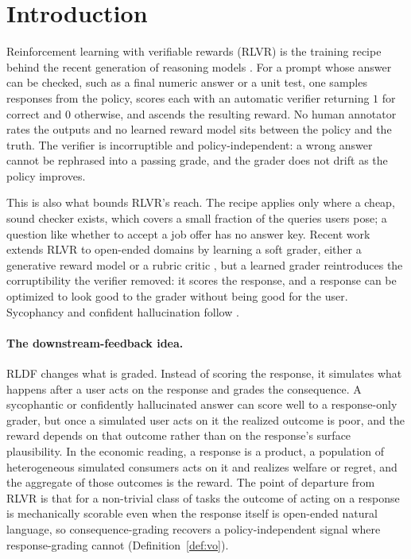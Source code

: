 \documentclass[11pt]{article}
\theoremstyle{plain}
\theoremstyle{definition}
\theoremstyle{remark}
\begin{document}
\section{Introduction}
\label{sec:intro}

Reinforcement learning with verifiable rewards (RLVR) is the training recipe behind the recent
generation of reasoning models \cite{deepseekr1,tulu3,deepseekmath}. For a prompt whose answer
can be checked, such as a final numeric answer or a unit test, one samples responses from the
policy, scores each with an automatic verifier returning $1$ for correct and $0$ otherwise, and
ascends the resulting reward. No human annotator rates the outputs and no learned reward model
sits between the policy and the truth. The verifier is incorruptible and policy-independent: a
wrong answer cannot be rephrased into a passing grade, and the grader does not drift as the
policy improves.

This is also what bounds RLVR's reach. The recipe applies only where a cheap, sound checker
exists, which covers a small fraction of the queries users pose; a question like whether to
accept a job offer has no answer key. Recent work extends RLVR to open-ended domains by learning
a soft grader, either a generative reward model or a rubric critic
\cite{crossingbridge,rlmt,truthrl}, but a learned grader reintroduces the corruptibility the
verifier removed: it scores the response, and a response can be optimized to look good to the
grader without being good for the user. Sycophancy and confident hallucination follow
\cite{sycophancy,williams}.

\paragraph{The downstream-feedback idea.}
RLDF changes what is graded. Instead of scoring the response, it simulates what happens after a
user acts on the response and grades the consequence. A sycophantic or confidently hallucinated
answer can score well to a response-only grader, but once a simulated user acts on it the
realized outcome is poor, and the reward depends on that outcome rather than on the response's
surface plausibility. In the economic reading, a response is a product, a population of
heterogeneous simulated consumers acts on it and realizes welfare or regret, and the aggregate
of those outcomes is the reward. The point of departure from RLVR is that for a non-trivial class
of tasks the outcome of acting on a response is mechanically scorable even when the response
itself is open-ended natural language, so consequence-grading recovers a policy-independent
signal where response-grading cannot (Definition~\ref{def:vo}).
\end{document}
